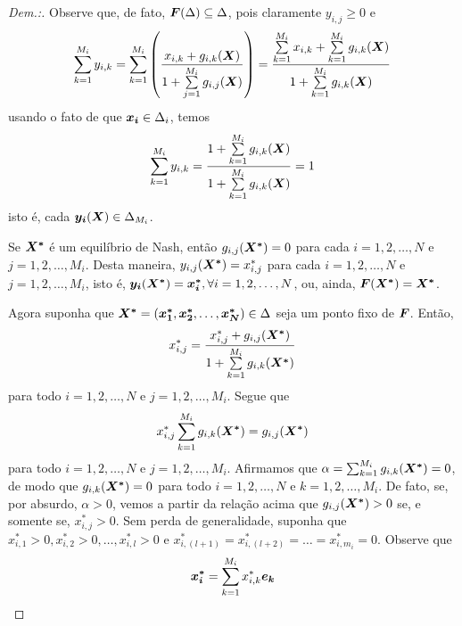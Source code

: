 \begin{proof}[Dem.:]
    Observe que, de fato, $\boldsymbol{F}(\Delta)\subseteq\Delta$, pois claramente $y_{i,j}\geq 0$ e
    \begin{equation}
        \sum_{k=1}^{M_i}y_{i,k}=\sum_{k=1}^{M_i}\left( \frac{x_{i,k}+g_{i,k}(\boldsymbol{X})}{1+\sum\limits_{j=1}^{M_i}g_{i,j}(\boldsymbol{X})} \right)=
        \frac{\sum\limits_{k=1}^{M_i}x_{i,k}+\sum\limits_{k=1}^{M_i}g_{i,k}(\boldsymbol{X})}{1+\sum\limits_{k=1}^{M_i}g_{i,k}(\boldsymbol{X})}
    \end{equation}
    usando o fato de que $\boldsymbol{x_i}\in\Delta_i$, temos
    \begin{equation}
         \sum_{k=1}^{M_i}y_{i,k}=\frac{1+\sum\limits_{k=1}^{M_i}g_{i,k}(\boldsymbol{X})}{1+\sum\limits_{k=1}^{M_i}g_{i,k}(\boldsymbol{X})} = 1
    \end{equation}
    isto é, cada $\boldsymbol{y_i}(\boldsymbol{X})\in\Delta_{M_i}$.
    
    Se $\boldsymbol{X^*}$ é um equilíbrio de Nash, então $g_{i,j}(\boldsymbol{X^*})=0$ para cada $i=1,2,\dots,N$ e $j=1,2,\dots,M_i$. Desta maneira, $y_{i,j}(\boldsymbol{X^*})=x^*_{i,j}$ para cada $i=1,2,\dots,N$ e ${j=1,2,\dots,M_i}$, isto é, $\boldsymbol{y_i}(\boldsymbol{X^*})=\boldsymbol{x_i^*},\forall i=1,2,\dots,N$, ou, ainda, $\boldsymbol{F}(\boldsymbol{X^*})=\boldsymbol{X^*}$.
    
    Agora suponha que $\boldsymbol{X^*}=(\boldsymbol{x^*_1},\boldsymbol{x^*_2},\dots,\boldsymbol{x^*_N})\in\Delta$ seja um ponto fixo de $\boldsymbol{F}$. Então,
    \begin{equation}
        x^*_{i,j}=\frac{x^*_{i,j}+g_{i,j}(\boldsymbol{X^*})}{1+\sum\limits_{k=1}^{M_i}g_{i,k}(\boldsymbol{X^*})}
    \end{equation}
    para todo $i=1,2,\dots,N$ e $j=1,2,\dots,M_i$. Segue que
    \begin{equation}
        x^*_{i,j}\sum_{k=1}^{M_i}g_{i,k}(\boldsymbol{X^*}) = g_{i,j}(\boldsymbol{X^*})
    \end{equation}
    para todo $i=1,2,\dots,N$ e $j=1,2,\dots,M_i$. Afirmamos que ${\alpha=\sum_{k=1}^{M_i}g_{i,k}(\boldsymbol{X^*})=0}$, de modo que $g_{i,k}(\boldsymbol{X^*})=0$ para todo $i=1,2,\dots,N$ e $k=1,2,\dots,M_i$. De fato, se, por absurdo, $\alpha>0$, vemos a partir da relação acima que $g_{i,j}(\boldsymbol{X^*})>0$ se, e somente se, $x^*_{i,j}>0$. Sem perda de generalidade, suponha que $x^*_{i,1}>0,x^*_{i,2}>0,\dots,x^*_{i,l}>0$ e $x^*_{i,(l+1)}=x^*_{i,(l+2)}= \dots=x^*_{i,m_i}=0$. Observe que
    \begin{equation}
        \boldsymbol{x^*_i}=\sum_{k=1}^{M_i}x_{i,k}^* \boldsymbol{e_k}
    \end{equation}
    

\end{proof}
